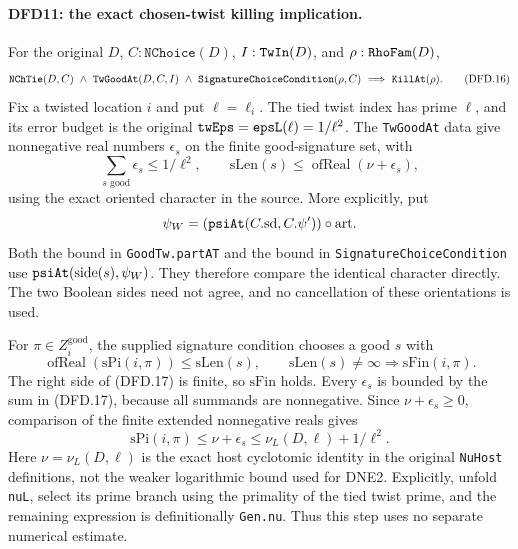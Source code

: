 \documentclass[11pt,a4paper]{article}
\numberwithin{equation}{section}
\theoremstyle{remark}\newtheorem{remark}[theorem]{Remark}
\begin{document}
\paragraph{DFD11: the exact chosen-twist killing implication.}
\label{claim:DFD11}
For the original $D$, $C:\texttt{NChoice}(D)$,
$I:\texttt{Tw\allowbreak In}(D)$, and $\rho:\texttt{Rho\allowbreak Fam}(D)$,
\[
 \texttt{NCh\allowbreak Tie}(D,C)\ \wedge\ \texttt{Tw\allowbreak Good\allowbreak At}(D,C,I)
 \ \wedge\ \texttt{Signature\allowbreak Choice\allowbreak Condition}(\rho,C)
       \ \Longrightarrow\ \texttt{Kill\allowbreak At}(\rho).        \tag{DFD.16}
\]
Fix a twisted location $i$ and put $\ell=\ell_i$.
The tied twist index has prime $\ell$, and its error budget
is the original $\texttt{tw\allowbreak Eps}=\texttt{eps\allowbreak L}(\ell)=1/\ell^2$.
The \texttt{Tw\allowbreak Good\allowbreak At} data give nonnegative real numbers
$\epsilon_s$ on the finite good-signature set, with
\[
 \sum_{s\text{ good}}\epsilon_s\le1/\ell^2,
 \qquad
 \mathrm{sLen}(s)\le
          \operatorname{ofReal}(\nu+\epsilon_s),         \tag{DFD.17}
\]
using the exact oriented character in the source. More
explicitly, put
\[
 \psi_W=(\texttt{psi\allowbreak At}(C.\mathrm{sd},C.\psi'))
                       \circ\mathrm{art}.
\]
Both the bound in \texttt{Good\allowbreak Tw.\allowbreak part\allowbreak AT} and the bound in
\texttt{Signature\allowbreak Choice\allowbreak Condition} use
$\texttt{psi\allowbreak At}(\mathrm{side}(s),\psi_W)$.
They therefore compare the identical character directly.
The two Boolean sides need not agree, and no cancellation
of these orientations is used.

For $\pi\in Z_i^{\mathrm{good}}$, the supplied signature
condition chooses a good $s$ with
\[
 \operatorname{ofReal}(\mathrm{sPi}(i,\pi))
    \le\mathrm{sLen}(s),
 \qquad\mathrm{sLen}(s)\ne\infty
                \Longrightarrow\mathrm{sFin}(i,\pi).
\]
The right side of (DFD.17) is finite, so $\mathrm{sFin}$
holds. Every $\epsilon_s$ is bounded by the sum in
(DFD.17), because all summands are nonnegative. Since
$\nu+\epsilon_s\ge0$, comparison of the finite extended
nonnegative reals gives
\[
       \mathrm{sPi}(i,\pi)
          \le\nu+\epsilon_s\le\nu_L(D,\ell)+1/\ell^2.     \tag{DFD.18}
\]
Here $\nu=\nu_L(D,\ell)$ is the exact host cyclotomic
identity in the original \texttt{Nu\allowbreak Host} definitions, not
the weaker logarithmic bound used for DNE2. Explicitly,
unfold \texttt{nu\allowbreak L}, select its prime branch using the
primality of the tied twist prime, and the remaining
expression is definitionally \texttt{Gen.\allowbreak nu}. Thus this
step uses no separate numerical estimate.
\end{document}
